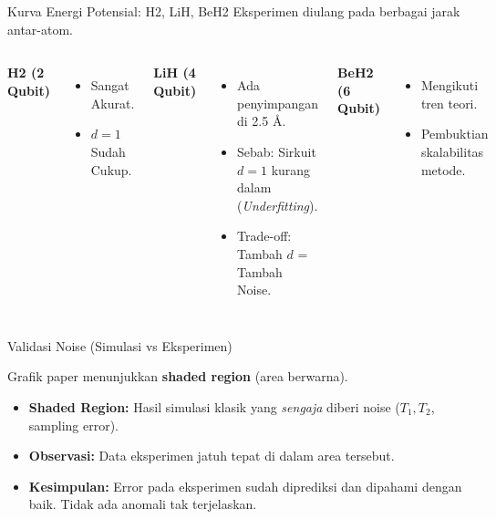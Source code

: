 \documentclass[aspectratio=169, 10pt]{beamer}
\begin{document}
\begin{frame}{Kurva Energi Potensial: H2, LiH, BeH2}
    Eksperimen diulang pada berbagai jarak antar-atom.
    \vspace{1em}
    
    \begin{columns}
        \centering
        \textbf{H2 (2 Qubit)}
        \vspace{0.5em}
        \begin{itemize}
            \item Sangat Akurat.
            \item $d=1$ Sudah Cukup.
        \end{itemize}

        \centering
        \textbf{LiH (4 Qubit)}
        \vspace{0.5em}
        \begin{itemize}
            \item Ada penyimpangan di 2.5 \AA.
            \item Sebab: Sirkuit $d=1$ kurang dalam (\textit{Underfitting}).
            \item Trade-off: Tambah $d$ = Tambah Noise.
        \end{itemize}

        \centering
        \textbf{BeH2 (6 Qubit)}
        \vspace{0.5em}
        \begin{itemize}
            \item Mengikuti tren teori.
            \item Pembuktian skalabilitas metode.
        \end{itemize}
    \end{columns}
\end{frame}

\begin{frame}{Validasi Noise (Simulasi vs Eksperimen)}
    \begin{tcolorbox}[colback=QuantumLight, colframe=QuantumDeepBlue, title=Pemahaman Error]
        Grafik paper menunjukkan \textbf{shaded region} (area berwarna).
    \end{tcolorbox}
    
    \begin{itemize}
        \item \textbf{Shaded Region:} Hasil simulasi klasik yang \textit{sengaja} diberi noise ($T_1, T_2$, sampling error).
        \item \textbf{Observasi:} Data eksperimen jatuh tepat di dalam area tersebut.
        \item \textbf{Kesimpulan:} Error pada eksperimen sudah diprediksi dan dipahami dengan baik. Tidak ada anomali tak terjelaskan.
    \end{itemize}
\end{frame}
\end{document}
